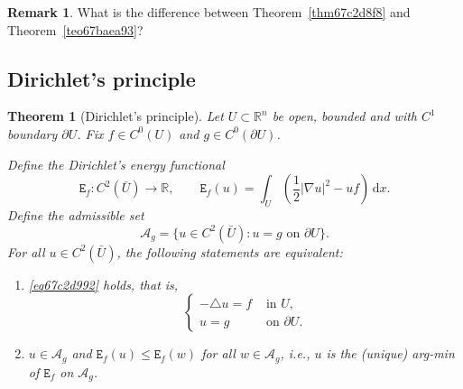 \documentclass[a4paper,9pt]{amsart}
\newcommand{\scr}[1]{\mathscr{#1}}
\newcommand{\R}{\mathbb{R}}	%
\newcommand{\did}{\,\mathrm{d}}	%
\newcommand{\de}{\partial}		%
\newcommand{\laplacian}{\triangle}
\newcommand{\grad}{\nabla}
\theoremstyle{plain}
\newtheorem{theorem}[proposition]{Theorem}
\theoremstyle{definition}
\newtheorem{remark}[proposition]{Remark}
\theoremstyle{remark}
\begin{document}
\begin{remark}
	What is the difference between Theorem~\ref{thm67c2d8f8} and Theorem~\ref{teo67baea93}?
\end{remark}

\subsection{Dirichlet's principle}\label{subs67c2da65}
\newcommand{\dirichletE}{\mathtt{E}}

\begin{theorem}[Dirichlet's principle]\label{thm67c2da70}
	Let $U\subset\R^n$ be open, bounded and with $C^1$ boundary $\de U$.
	Fix $f\in C^0(U)$ and $g\in C^0(\de U)$.
	
	Define the \emph{Dirichlet's energy functional}
	\begin{equation}
		\dirichletE_f : C^2(\bar U)\to\R,
		\qquad
		\dirichletE_f(u) = \int_U (\frac12 |\grad u|^2 - uf) \did x .
	\end{equation}
	Define the \emph{admissible set}
	\begin{equation}
		\scr A_g = \{ u\in C^2(\bar U) : u = g \text{ on }\de U \} .
	\end{equation}
	For all $u\in C^2(\bar U)$, the following statements are equivalent:
	\begin{enumerate}[label=(\roman*)]
	\item\label{thm67c2da70_i}
	\eqref{eq67c2d992} holds, that is,
		\begin{equation*}
		\begin{cases}
			-\laplacian u = f & \text{ in }U , \\
			u = g & \text{ on }\de U .
		\end{cases}
		\end{equation*}
	\item\label{thm67c2da70_ii}
		$u\in\scr A_g$ and $\dirichletE_f(u) \le \dirichletE_f(w)$ for all $w\in \scr A_g$, i.e., 
		$u$ is the (unique) arg-min of $\dirichletE_f$ on $\scr A_g$.
	\end{enumerate}
\end{theorem}
\end{document}
